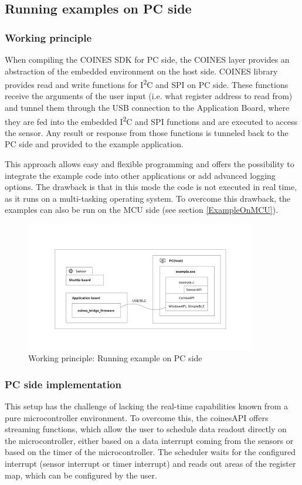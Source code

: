 \documentclass{article}
\begin{document}
\subsection{Running examples on PC side}
\subsubsection{Working principle}
When compiling the COINES SDK for PC side, the COINES layer provides an abstraction of the embedded environment on the host side. COINES library provides read and write functions for I\textsuperscript{2}C and SPI on PC side. These functions receive the arguments of the user input (i.e. what register address to read from) and tunnel them through the USB connection to the Application Board, where they are fed into the embedded I\textsuperscript{2}C and SPI functions and are executed to access the sensor. Any result or response from those functions is tunneled back to the PC side and provided to the example application.

This approach allows easy and flexible programming and offers the possibility to integrate the example code into other applications or add advanced logging options. The drawback is that in this mode the code is not executed in real time, as it runs on a multi-tasking operating system. To overcome this drawback, the examples can also be run on the MCU side (see section \ref{ExampleOnMCU}).

\begin{figure}[H]
	\begin{center}
		\includegraphics[width=0.9\textwidth]{coinesAPI_images/COINES_workingPrinciple_runOnPC.png}
		\caption{Working principle: Running example on PC side}
	\end{center}
\end{figure}

\subsubsection{PC side implementation}
This setup has the challenge of lacking the real-time capabilities known from a pure microcontroller environment. To overcome this, the coinesAPI offers streaming functions, which allow the user to schedule data readout directly on the microcontroller, either based on a data interrupt coming from the sensors or based on the timer of the microcontroller. The scheduler waits for the configured interrupt (sensor interrupt or timer interrupt) and reads out areas of the register map, which can be configured by the user.
\end{document}
